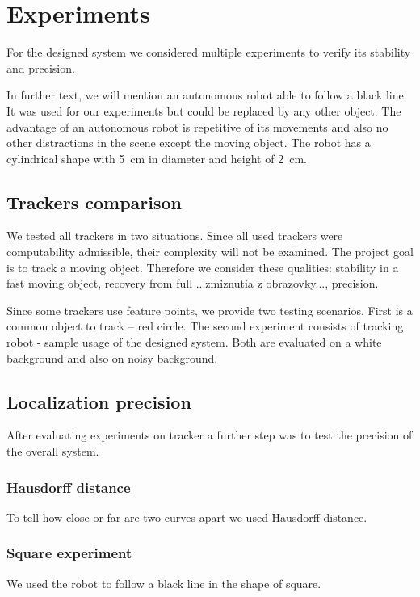 \chapter{Experiments} For the designed system we considered multiple experiments to
verify its stability and precision.

In further text, we will mention an autonomous robot able to follow a black
line.  It was used for our experiments but could be replaced by any other
object. The advantage of an autonomous robot is repetitive of its movements and
also no other distractions in the scene except the moving object. The robot has
a cylindrical shape with 5~cm in diameter and height of 2~cm.

\section{Trackers comparison} We tested all trackers in two situations. Since
all used trackers were computability admissible, their complexity will not be
examined. The project goal is to track a moving object. Therefore we consider
these qualities: stability in a fast moving object, recovery from full
...zmiznutia z obrazovky..., precision.

Since some trackers use feature points, we provide two testing scenarios. First
is a common object to track -- red circle. The second experiment consists of
tracking robot - sample usage of the designed system. Both are evaluated on a white
background and also on noisy background.

\section{Localization precision} After evaluating experiments on tracker a
further step was to test the precision of the overall system.

\subsection{Hausdorff distance} To tell how close or far are two
curves apart we used Hausdorff distance.

\subsection{Square experiment} We used the robot to follow a black line in the shape of
square.

